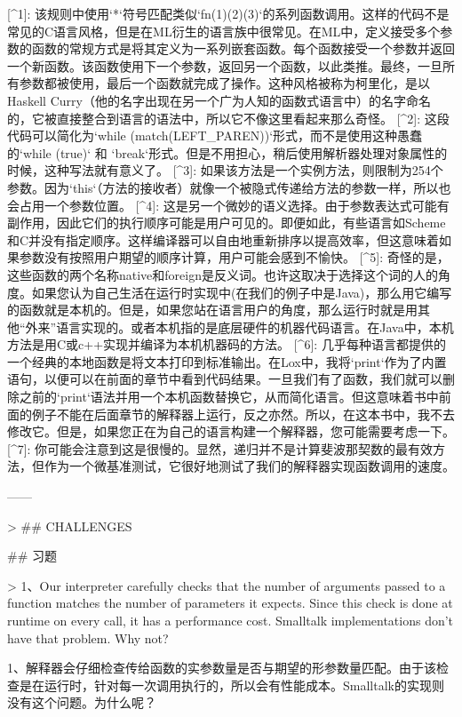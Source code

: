 \documentclass[cn,11pt,chinese]{elegantbook}
\begin{document}
{{{{{{{{{{{{[^1]: 该规则中使用`*`符号匹配类似`fn(1)(2)(3)`的系列函数调用。这样的代码不是常见的C语言风格，但是在ML衍生的语言族中很常见。在ML中，定义接受多个参数的函数的常规方式是将其定义为一系列嵌套函数。每个函数接受一个参数并返回一个新函数。该函数使用下一个参数，返回另一个函数，以此类推。最终，一旦所有参数都被使用，最后一个函数就完成了操作。这种风格被称为柯里化，是以Haskell Curry（他的名字出现在另一个广为人知的函数式语言中）的名字命名的，它被直接整合到语言的语法中，所以它不像这里看起来那么奇怪。
[^2]: 这段代码可以简化为`while (match(LEFT_PAREN))`形式，而不是使用这种愚蠢的`while (true)` 和 `break`形式。但是不用担心，稍后使用解析器处理对象属性的时候，这种写法就有意义了。
[^3]: 如果该方法是一个实例方法，则限制为254个参数。因为`this`（方法的接收者）就像一个被隐式传递给方法的参数一样，所以也会占用一个参数位置。
[^4]: 这是另一个微妙的语义选择。由于参数表达式可能有副作用，因此它们的执行顺序可能是用户可见的。即便如此，有些语言如Scheme和C并没有指定顺序。这样编译器可以自由地重新排序以提高效率，但这意味着如果参数没有按照用户期望的顺序计算，用户可能会感到不愉快。
[^5]: 奇怪的是，这些函数的两个名称native和foreign是反义词。也许这取决于选择这个词的人的角度。如果您认为自己生活在运行时实现中(在我们的例子中是Java)，那么用它编写的函数就是本机的。但是，如果您站在语言用户的角度，那么运行时就是用其他“外来”语言实现的。或者本机指的是底层硬件的机器代码语言。在Java中，本机方法是用C或c++实现并编译为本机机器码的方法。
[^6]: 几乎每种语言都提供的一个经典的本地函数是将文本打印到标准输出。在Lox中，我将`print`作为了内置语句，以便可以在前面的章节中看到代码结果。一旦我们有了函数，我们就可以删除之前的`print`语法并用一个本机函数替换它，从而简化语言。但这意味着书中前面的例子不能在后面章节的解释器上运行，反之亦然。所以，在这本书中，我不去修改它。但是，如果您正在为自己的语言构建一个解释器，您可能需要考虑一下。
[^7]: 你可能会注意到这是很慢的。显然，递归并不是计算斐波那契数的最有效方法，但作为一个微基准测试，它很好地测试了我们的解释器实现函数调用的速度。



------

> ## CHALLENGES

## 习题

> 1、Our interpreter carefully checks that the number of arguments passed to a function matches the number of parameters it expects. Since this check is done at runtime on every call, it has a performance cost. Smalltalk implementations don’t have that problem. Why not?

1、解释器会仔细检查传给函数的实参数量是否与期望的形参数量匹配。由于该检查是在运行时，针对每一次调用执行的，所以会有性能成本。Smalltalk的实现则没有这个问题。为什么呢？

}}}}}}}}}}}}
\end{document}
